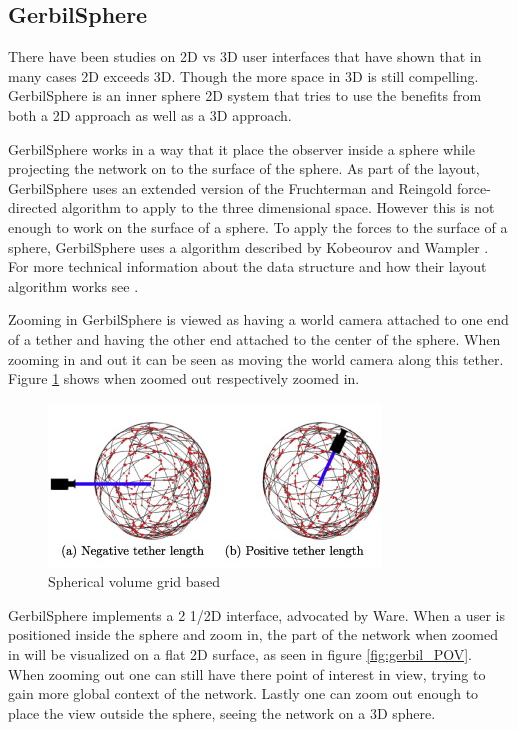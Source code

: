 \documentclass[a4paper,11pt]{kth-mag}
\begin{document}
\subsection{GerbilSphere}
\label{Gerbil:chap2}
There have been studies on 2D vs 3D user interfaces that have shown that in many cases 2D exceeds 3D. Though the more space in 3D is still compelling. GerbilSphere is an inner sphere 2D system that tries to 
use the benefits from both a 2D approach as well as a 3D approach.

GerbilSphere works in a way that it place the observer inside a sphere while projecting the network on to the surface of the sphere. As part of the layout, GerbilSphere uses an extended version of the
 Fruchterman and Reingold force-directed algorithm to apply to the three dimensional space. However this is not enough to work on the surface of a sphere. To apply the forces to the surface of a sphere, GerbilSphere uses a 
 algorithm described by Kobeourov and Wampler \cite{kobourov}. For more technical information about the data structure and how their layout algorithm works see \cite{Shelley20121016}.

Zooming in GerbilSphere is viewed as having a world camera attached to one end of a tether and having the other end attached to the center of the sphere. When zooming in and out it can be seen as moving the world camera along this 
tether. Figure \ref{fig:gerbil_zoom} shows when zoomed out respectively zoomed in.
\begin{figure}[!htbp]
	\centering
	\includegraphics{GerbilZoomTether}
	\caption{Spherical volume grid based}
	\label{fig:gerbil_zoom}
\end{figure}

GerbilSphere implements a 2 1/2D interface, advocated by Ware\cite{Ware}. When a user is positioned inside the sphere and zoom in, the part of the network when zoomed in will be visualized on a flat 2D surface, as seen in figure
\ref{fig:gerbil_POV}. When zooming out one can still have there point of interest in view, trying to gain more global context of the network. Lastly one can zoom
 out enough to place the view outside the sphere, seeing the network on a 3D sphere.
 
\end{document}
